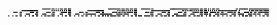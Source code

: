 \documentclass[10pt]{article}
\theoremstyle{plain}
\theoremstyle{definition}
\begin{document}
\begin{table*}[b]
{\begin{minipage}{5.32in}
\[\begin{array}{@{}r@{}}
\begin{array}{@{}l@{}}
\a\a\a\a\a\a\a\a\a\a\a\a\a\a\a\a\a\a\a\a\a\a\a\a\a\a\a\a\a\a\a\a\a\a\a\a \b\b\b\b\b\b\b\b\a\b\b\b\a\b\a\b\a\b\b\b\a\b\b\b\a\b\b\b\a\a\a\a\a\a\a\a \a\a\a\a\a\a\a\a\a\a\a\a\a\a\a\a\a\a\a\a\a\a\a\a\a\a\a\a\b\b\b\b\b\b\b\b \b\b\b\b\a\b\b\b\a\b\b\b\a\b\b\b\a\b\b\b\a\a\a\a\b\b\b\b\b\b\b\b\b\a\b\b \a\a\a\a\a\a\a\a\a\a\a\a\a\a\a\a\b\b\b\b\b\b\b\b\b\b\b\b\b\b\b\b\b\b\a\b \b\b\b\b\b\b\b\b\a\b\b\b\a\b\b\b\a\b\a\b\a\b\b\b\a\b\b\b\a\a\a\a\a\a\a\a \a\a\a\a\a\a\a\a\b\b\a\b\b\b\b\b\b\b\b\b\a\b\b\b\b\b\b\b\b\b\b\b\b\b\b\b \b\b\b\b\mynl
\a\a\a\a\a\a\a\a\a\a\a\a\a\a\a\a\b\b\b\b\b\b\b\b\b\b\b\b\b\b\b\b\a\a\a\a \a\a\a\a\a\a\a\a\a\b\a\b\a\b\a\b\a\b\a\b\a\b\a\b\a\b\b\b\a\a\a\a\a\a\a\a \a\a\a\a\a\a\a\a\b\b\b\b\b\b\b\b\b\b\b\b\b\b\b\b\a\a\a\a\a\a\a\a\a\a\a\a \a\b\a\b\a\b\b\b\a\b\a\b\a\b\a\b\a\b\b\b\a\a\a\a\a\a\a\a\a\a\a\a\a\a\b\b \b\b\b\b\b\b\b\b\b\b\b\b\b\b\b\b\a\a\a\a\a\a\a\a\a\a\a\a\b\b\a\b\a\b\a\b \b\b\a\b\a\b\a\b\a\b\b\b\a\b\b\b\a\b\a\b\a\b\a\b\a\b\a\b\b\b\b\b\b\b\b\b \b\b\b\b\b\b\b\b\b\a\a\b\a\a\a\a\a\a\a\a\a\b\a\b\b\b\a\b\b\b\a\b\b\b\a\b \b\b\b\b\mynl
\a\a\a\a\a\a\a\a\b\b\b\b\a\a\b\b\a\a\a\a\a\a\a\a\b\b\b\b\a\a\b\b\a\a\a\a \a\a\a\a\b\b\b\b\a\a\b\b\a\a\a\a\a\a\b\b\b\b\b\b\a\b\b\b\a\a\a\a\a\a\a\a \b\b\b\b\a\a\b\b\a\a\a\a\a\a\a\a\b\b\b\b\a\a\b\b\a\a\a\a\a\a\a\a\b\b\b\b \b\a\b\b\a\b\a\b\b\a\b\b\b\b\b\b\a\b\b\b\a\a\a\a\a\a\a\a\b\b\b\b\a\b\b\b \a\a\a\a\a\a\a\a\b\b\b\b\a\a\b\b\a\a\a\a\a\a\a\a\b\b\b\b\a\a\b\b\a\a\a\a \a\a\b\b\b\b\b\b\a\b\b\b\a\b\b\b\b\a\a\b\b\b\b\b\b\a\b\b\a\a\b\b\a\a\a\a \b\b\b\b\b\a\b\b\a\a\b\b\a\a\a\a\b\b\b\b\b\a\b\b\a\a\b\b\a\a\b\b\b\b\b\b \b\b\b\b\mynl
\a\a\a\a\a\a\a\a\a\a\a\a\a\a\b\b\a\a\a\a\b\b\b\b\a\a\a\a\a\b\b\b\a\a\a\a \b\b\b\b\a\a\a\a\a\b\b\b\a\a\a\a\a\b\b\b\a\a\a\a\a\b\b\b\a\a\a\a\b\b\b\b \a\a\a\a\b\a\b\b\b\b\b\b\b\b\b\b\a\a\a\a\b\b\b\b\b\b\b\b\b\b\b\b\a\a\a\a \b\b\b\b\b\b\a\b\b\b\b\b\a\a\a\a\a\b\b\b\a\a\a\a\a\a\a\a\a\a\a\a\a\b\b\b \a\a\a\a\b\b\b\b\a\a\a\a\a\b\b\b\a\a\a\a\b\b\b\b\a\a\a\a\a\b\b\b\a\a\a\a \b\b\b\b\a\a\a\a\a\b\b\b\a\b\b\b\b\a\b\b\a\a\a\a\b\b\b\b\a\b\b\b\b\b\b\b \a\a\a\a\b\b\b\b\a\a\b\b\b\b\b\b\a\a\a\a\b\b\b\b\a\b\b\b\a\b\b\b\a\a\a\a \b\b\b\b\mynl
\a\a\a\b\a\a\a\b\a\a\b\b\a\a\b\b\a\a\a\b\a\a\a\b\a\a\b\b\a\a\b\b\a\a\a\b \a\a\b\b\a\b\b\b\a\b\b\b\a\a\a\b\a\a\a\b\a\a\b\b\a\a\b\b\a\a\a\b\a\a\a\b \a\a\b\b\a\a\b\b\a\a\a\b\a\a\a\b\a\a\b\b\a\a\b\b\a\b\a\b\b\a\b\b\b\b\b\b \a\b\b\b\a\a\b\b\a\a\a\b\a\a\b\b\a\a\b\b\a\b\b\b\b\a\a\b\b\b\b\b\b\a\b\b \a\a\b\b\a\a\a\b\b\a\b\b\b\a\b\b\a\a\b\b\a\a\b\b\b\b\b\b\b\b\b\b\a\a\b\b \a\a\a\b\b\a\b\b\b\a\b\b\a\a\a\b\a\a\b\b\a\a\b\b\a\a\b\b\a\a\a\b\a\a\a\b \a\a\b\b\a\a\b\b\a\a\a\b\a\a\b\b\a\b\b\b\a\b\b\b\a\a\a\b\a\a\a\b\a\a\b\b \a\a\b\b\mynl

\end{array}
\end{array}\]
\end{minipage}}
\end{table*}
\end{document}
